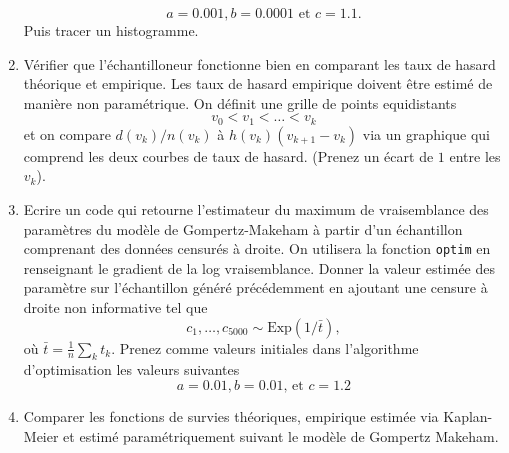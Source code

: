 \documentclass[11pt, answers]{exam}
\begin{document}
\begin{questions}
\begin{parts}
\begin{enumerate}
$$
a= 0.001, b= 0.0001\text{ et } c= 1.1.
$$
Puis tracer un histogramme.
\item  Vérifier que l'échantilloneur fonctionne bien en comparant les taux de hasard théorique et empirique. Les taux de hasard empirique doivent être estimé de manière non paramétrique. On définit une grille de points equidistants 
$$
v_0<v_1<\ldots <v_k
$$
et on compare $d(v_k)/n(v_k)$ à $h(v_k)  (v_{k+1}-v_k)$ via un graphique qui comprend les deux courbes de taux de hasard. (Prenez un écart de $1$ entre les $v_k$).
\item Ecrire un code qui retourne l'estimateur du maximum de vraisemblance des paramètres du modèle de Gompertz-Makeham à partir d'un échantillon comprenant des données censurés à droite. On utilisera la fonction \texttt{optim} en renseignant le gradient de la log vraisemblance. Donner la valeur estimée des paramètre sur l'échantillon généré précédemment en ajoutant une censure à droite non informative tel que 
$$
c_1,\ldots, c_{5000}\sim \text{Exp}(1/\bar t),
$$
où $\bar{t} = \frac{1}{n}\sum_k t_k$. Prenez comme valeurs initiales dans l'algorithme d'optimisation les valeurs suivantes 
$$
a =0.01, b = 0.01\text{, et }c = 1.2
$$
\item  Comparer les fonctions de survies théoriques, empirique estimée via Kaplan-Meier et estimé paramétriquement suivant le modèle de Gompertz Makeham.
\end{enumerate}
\end{parts}


\end{questions}


\end{document}
